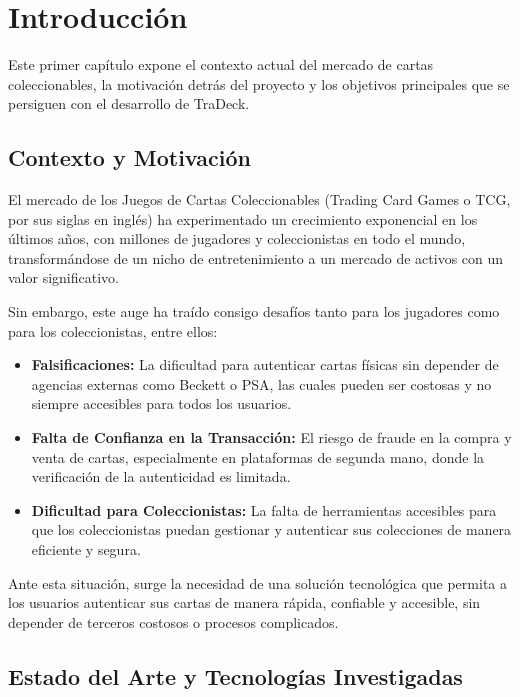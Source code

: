 \chapter{Introducción}\label{cap:introduccion}

Este primer capítulo expone el contexto actual del mercado de cartas coleccionables, la motivación 
detrás del proyecto y los objetivos principales que se persiguen con el desarrollo de TraDeck.

\section{Contexto y Motivación}
El mercado de los Juegos de Cartas Coleccionables (Trading Card Games o TCG, por sus siglas en inglés) ha experimentado un 
crecimiento exponencial en los últimos años, con millones de jugadores y coleccionistas en todo el mundo, 
transformándose de un nicho de entretenimiento a un mercado de activos con un valor significativo.

Sin embargo, este auge ha traído consigo desafíos tanto para los jugadores como para los coleccionistas, entre 
ellos:

\begin{itemize}
    \item \textbf{Falsificaciones:} La dificultad para autenticar cartas físicas sin depender de agencias 
    externas como Beckett o PSA, las cuales pueden ser costosas y no siempre accesibles para todos los usuarios.
    \item \textbf{Falta de Confianza en la Transacción:} El riesgo de fraude en la compra y venta de cartas,
    especialmente en plataformas de segunda mano, donde la verificación de la autenticidad es limitada.
    \item \textbf{Dificultad para Coleccionistas:} La falta de herramientas accesibles para que los coleccionistas 
    puedan gestionar y autenticar sus colecciones de manera eficiente y segura.
\end{itemize}

Ante esta situación, surge la necesidad de una solución tecnológica que permita a los usuarios autenticar sus cartas 
de manera rápida, confiable y accesible, sin depender de terceros costosos o procesos complicados. 

\section{Estado del Arte y Tecnologías Investigadas}

